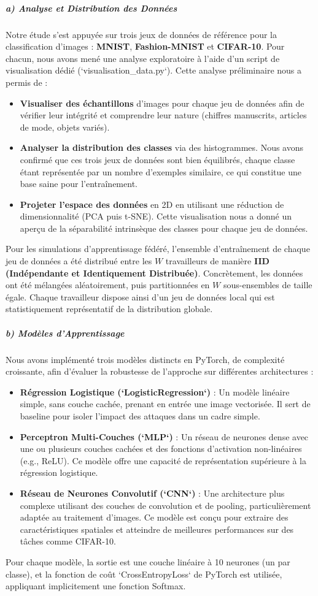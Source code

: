 \documentclass{article}
\begin{document}
\subparagraph{a) Analyse et Distribution des Données}
Notre étude s'est appuyée sur trois jeux de données de référence pour la classification d'images : \textbf{MNIST}, \textbf{Fashion-MNIST} et \textbf{CIFAR-10}. Pour chacun, nous avons mené une analyse exploratoire à l'aide d'un script de visualisation dédié (`visualisation_data.py`). Cette analyse préliminaire nous a permis de :
\begin{itemize}
    \item \textbf{Visualiser des échantillons} d'images pour chaque jeu de données afin de vérifier leur intégrité et comprendre leur nature (chiffres manuscrits, articles de mode, objets variés).
    \item \textbf{Analyser la distribution des classes} via des histogrammes. Nous avons confirmé que ces trois jeux de données sont bien équilibrés, chaque classe étant représentée par un nombre d'exemples similaire, ce qui constitue une base saine pour l'entraînement.
    \item \textbf{Projeter l'espace des données} en 2D en utilisant une réduction de dimensionnalité (PCA puis t-SNE). Cette visualisation nous a donné un aperçu de la séparabilité intrinsèque des classes pour chaque jeu de données.
\end{itemize}
Pour les simulations d'apprentissage fédéré, l'ensemble d'entraînement de chaque jeu de données a été distribué entre les $W$ travailleurs de manière \textbf{IID (Indépendante et Identiquement Distribuée)}. Concrètement, les données ont été mélangées aléatoirement, puis partitionnées en $W$ sous-ensembles de taille égale. Chaque travailleur dispose ainsi d'un jeu de données local qui est statistiquement représentatif de la distribution globale.

\subparagraph{b) Modèles d'Apprentissage}
Nous avons implémenté trois modèles distincts en PyTorch, de complexité croissante, afin d'évaluer la robustesse de l'approche sur différentes architectures :
\begin{itemize}
    \item \textbf{Régression Logistique (`LogisticRegression`)} : Un modèle linéaire simple, sans couche cachée, prenant en entrée une image vectorisée. Il sert de baseline pour isoler l'impact des attaques dans un cadre simple.
    \item \textbf{Perceptron Multi-Couches (`MLP`)} : Un réseau de neurones dense avec une ou plusieurs couches cachées et des fonctions d'activation non-linéaires (e.g., ReLU). Ce modèle offre une capacité de représentation supérieure à la régression logistique.
    \item \textbf{Réseau de Neurones Convolutif (`CNN`)} : Une architecture plus complexe utilisant des couches de convolution et de pooling, particulièrement adaptée au traitement d'images. Ce modèle est conçu pour extraire des caractéristiques spatiales et atteindre de meilleures performances sur des tâches comme CIFAR-10.
\end{itemize}
Pour chaque modèle, la sortie est une couche linéaire à 10 neurones (un par classe), et la fonction de coût `CrossEntropyLoss` de PyTorch est utilisée, appliquant implicitement une fonction Softmax.
\end{document}
